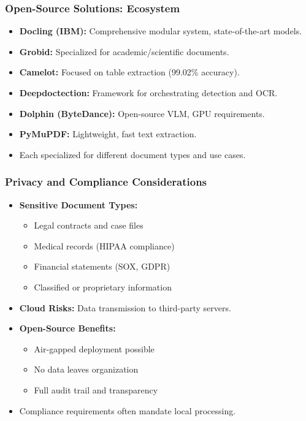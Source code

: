 \begin{frame}[fragile]\frametitle{Open-Source Solutions: Ecosystem}
      \begin{itemize}
        \item \textbf{Docling (IBM):} Comprehensive modular system, state-of-the-art models.
        \item \textbf{Grobid:} Specialized for academic/scientific documents.
        \item \textbf{Camelot:} Focused on table extraction (99.02\% accuracy).
        \item \textbf{Deepdoctection:} Framework for orchestrating detection and OCR.
        \item \textbf{Dolphin (ByteDance):} Open-source VLM, GPU requirements.
        \item \textbf{PyMuPDF:} Lightweight, fast text extraction.
        \item Each specialized for different document types and use cases.
      \end{itemize}
\end{frame}

\begin{frame}[fragile]\frametitle{Privacy and Compliance Considerations}
      \begin{itemize}
        \item \textbf{Sensitive Document Types:}
        \begin{itemize}
          \item Legal contracts and case files
          \item Medical records (HIPAA compliance)
          \item Financial statements (SOX, GDPR)
          \item Classified or proprietary information
        \end{itemize}
        \item \textbf{Cloud Risks:} Data transmission to third-party servers.
        \item \textbf{Open-Source Benefits:}
        \begin{itemize}
          \item Air-gapped deployment possible
          \item No data leaves organization
          \item Full audit trail and transparency
        \end{itemize}
        \item Compliance requirements often mandate local processing.
      \end{itemize}
\end{frame}

